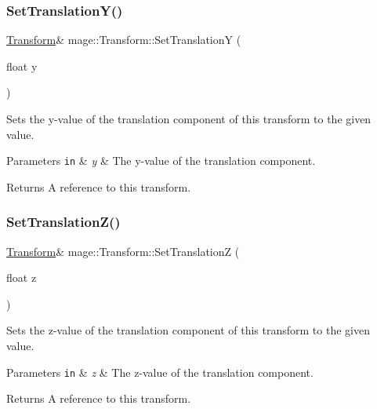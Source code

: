 \subsubsection{\texorpdfstring{Set\+Translation\+Y()}{SetTranslationY()}}
{\footnotesize\ttfamily \hyperlink{structmage_1_1_transform}{Transform}\& mage\+::\+Transform\+::\+Set\+TranslationY (\begin{DoxyParamCaption}\item[{float}]{y }\end{DoxyParamCaption})}

Sets the y-\/value of the translation component of this transform to the given value.


\begin{DoxyParams}[1]{Parameters}
\mbox{\tt in}  & {\em y} & The y-\/value of the translation component. \\
\hline
\end{DoxyParams}
\begin{DoxyReturn}{Returns}
A reference to this transform. 
\end{DoxyReturn}
\hypertarget{structmage_1_1_transform_a4fa664d666f3b907d4dfbc0d9cd3a13a}{}\label{structmage_1_1_transform_a4fa664d666f3b907d4dfbc0d9cd3a13a} 
\subsubsection{\texorpdfstring{Set\+Translation\+Z()}{SetTranslationZ()}}
{\footnotesize\ttfamily \hyperlink{structmage_1_1_transform}{Transform}\& mage\+::\+Transform\+::\+Set\+TranslationZ (\begin{DoxyParamCaption}\item[{float}]{z }\end{DoxyParamCaption})}

Sets the z-\/value of the translation component of this transform to the given value.


\begin{DoxyParams}[1]{Parameters}
\mbox{\tt in}  & {\em z} & The z-\/value of the translation component. \\
\hline
\end{DoxyParams}
\begin{DoxyReturn}{Returns}
A reference to this transform. 
\end{DoxyReturn}
\hypertarget{structmage_1_1_transform_a9771fc6768200e2b5cc9d425a334a1e7}{}\label{structmage_1_1_transform_a9771fc6768200e2b5cc9d425a334a1e7} 
